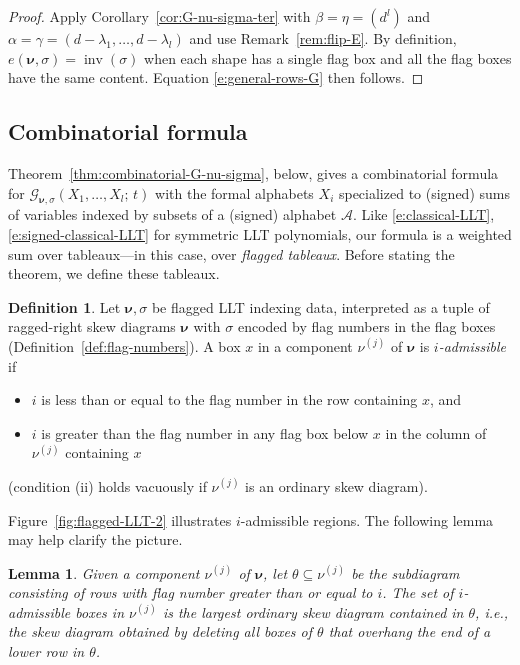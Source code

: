 \documentclass[12pt]{amsart}
\newtheorem{lemma}[thm]{Lemma}
\theoremstyle{definition}
\newtheorem{defn}[thm]{Definition}
\theoremstyle{remark}
\newcommand{\nubold}{{\boldsymbol \nu }}
\newcommand{\Acal}{{\mathcal A}}
\newcommand{\Gcal}{{\mathcal G}}
\DeclareMathOperator{\inv}{inv}
\begin{document}
\begin{proof}
Apply Corollary~\ref{cor:G-nu-sigma-ter} with \(\beta = \eta = (d^l)\)
and \(\alpha = \gamma = (d-\lambda_1,\ldots,d-\lambda_l)\) and use
Remark~\ref{rem:flip-E}.  By definition, \(e(\nubold,\sigma) =
\inv(\sigma)\) when each shape has a single flag box and all the flag
boxes have the same content.  Equation \eqref{e:general-rows-G} then
follows.
\end{proof}


\subsection{Combinatorial formula}
\label{ss:combinatorial-formula}

Theorem~\ref{thm:combinatorial-G-nu-sigma}, below, gives a
combinatorial formula for $\Gcal _{\nubold ,\sigma
}(X_{1},\ldots,X_{l};\, t)$ with the formal alphabets $X_{i}$
specialized to (signed) sums of variables indexed by subsets of a
(signed) alphabet $\Acal $.  Like \eqref{e:classical-LLT},
\eqref{e:signed-classical-LLT} for symmetric LLT polynomials, our
formula is a weighted sum over tableaux---in this case, over {\em
flagged tableaux}.  Before stating the theorem, we define these
tableaux.


\begin{defn}\label{def:i-admissible}
Let $\nubold ,\sigma $ be flagged LLT indexing data, interpreted as a
tuple of ragged-right skew diagrams $\nubold $ with $\sigma $ encoded
by flag numbers in the flag boxes (Definition~\ref{def:flag-numbers}).
A box $x$ in a component $\nu ^{(j)}$ of $\nubold $ is {\em
$i$-admissible} if
\begin{itemize}
\item [(i)] $i$ is less than or equal to the flag number in the row
containing $x$, and
\item [(ii)] $i$ is greater than the flag number in any flag box below
$x$ in the column of $\nu^{(j)}$ containing $x$
\end{itemize}
(condition (ii) holds vacuously if $\nu ^{(j)}$ is an ordinary skew
diagram).
\end{defn}


Figure~\ref{fig:flagged-LLT-2} illustrates $i$-admissible regions.
The following lemma may help clarify the picture.

\begin{lemma}\label{lem:i-admissible}
Given a component $\nu ^{(j)}$ of $\nubold $, let $\theta \subseteq
\nu ^{(j)}$ be the subdiagram consisting of rows with flag number
greater than or equal to $i$.  The set of $i$-admissible boxes in $\nu
^{(j)}$ is the largest ordinary skew diagram contained in $\theta $,
i.e., the skew diagram obtained by deleting all boxes of $\theta $
that overhang the end of a lower row in $\theta $.
\end{lemma}
\end{document}
